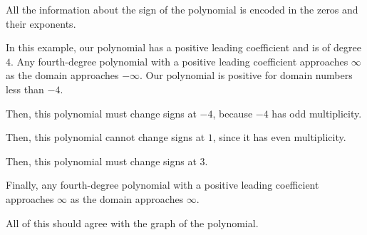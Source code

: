 \documentclass{ximera}
\begin{document}
\begin{example}
\begin{image}
  \end{image}




All the information about the sign of the polynomial is encoded in the zeros and their exponents. 


In this example, our polynomial has a positive leading coefficient and is of degree $4$. Any fourth-degree polynomial with a positive leading coefficient approaches $\infty$ as the domain approaches $-\infty$.  Our polynomial is positive for domain numbers less than $-4$.


Then, this polynomial must change signs at $-4$, because $-4$ has odd multiplicity.  

Then, this polynomial cannot change signs at $1$, since it has even multiplicity.  

Then, this polynomial must change signs at $3$.  

Finally, any fourth-degree polynomial with a positive leading coefficient approaches $\infty$ as the domain approaches $\infty$.
 


\end{example}

All of this should agree with the graph of the polynomial. 
\end{document}
